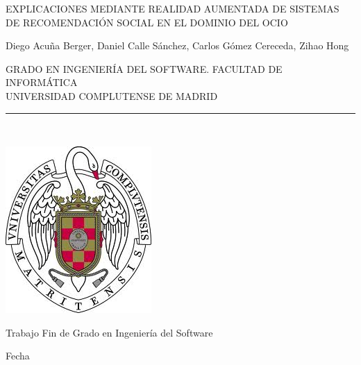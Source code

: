 \begin{center}

   \vspace{1cm}


   {\Large EXPLICACIONES MEDIANTE REALIDAD AUMENTADA DE SISTEMAS DE RECOMENDACIÓN SOCIAL EN EL DOMINIO DEL OCIO}\\

   \vspace{0.5cm}



   \vspace{0.5cm}



    Diego Acuña Berger, Daniel Calle Sánchez, Carlos Gómez Cereceda, Zihao Hong\\

   \vspace{0.5cm}




   GRADO EN INGENIERÍA DEL SOFTWARE. FACULTAD DE INFORMÁTICA\\
   UNIVERSIDAD COMPLUTENSE DE MADRID \\


   \vspace{0.65cm}
   \rule{2in}{0.5pt}\\
   \vspace{0.85cm}

  \includegraphics[height=2.5in]{figures/escudo.jpg}
  

   \vspace{0.5cm}
Trabajo Fin de Grado en Ingeniería del Software

   \vspace{0.5cm}






  Fecha\\
   \vspace{1cm}

\end{center}

